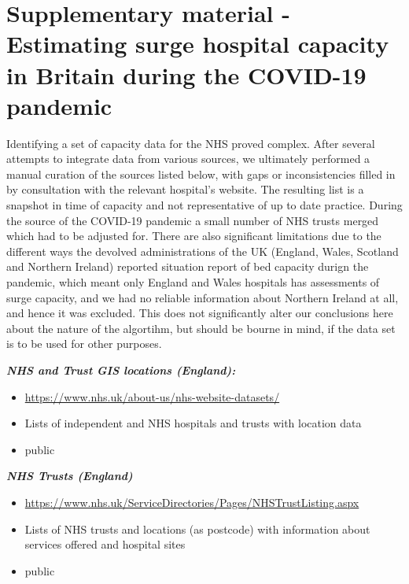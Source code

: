 \documentclass[
]{article}
\providecommand{\tightlist}{%
  \setlength{\itemsep}{0pt}\setlength{\parskip}{0pt}}
\begin{document}
\hypertarget{supplementary-material---estimating-surge-hospital-capacity-in-britain-during-the-covid-19-pandemic}{%
\section{Supplementary material - Estimating surge hospital capacity in
Britain during the COVID-19
pandemic}\label{supplementary-material---estimating-surge-hospital-capacity-in-britain-during-the-covid-19-pandemic}}

Identifying a set of capacity data for the NHS proved complex. After
several attempts to integrate data from various sources, we ultimately
performed a manual curation of the sources listed below, with gaps or
inconsistencies filled in by consultation with the relevant hospital's
website. The resulting list is a snapshot in time of capacity and not
representative of up to date practice. During the source of the COVID-19
pandemic a small number of NHS trusts merged which had to be adjusted
for. There are also significant limitations due to the different ways
the devolved administrations of the UK (England, Wales, Scotland and
Northern Ireland) reported situation report of bed capacity durign the
pandemic, which meant only England and Wales hospitals has assessments
of surge capacity, and we had no reliable information about Northern
Ireland at all, and hence it was excluded. This does not significantly
alter our conclusions here about the nature of the algortihm, but should
be bourne in mind, if the data set is to be used for other purposes.

\textbf{\emph{NHS and Trust GIS locations (England):}}

\begin{itemize}
\tightlist
\item
  \url{https://www.nhs.uk/about-us/nhs-website-datasets/}
\item
  Lists of independent and NHS hospitals and trusts with location data
\item
  public
\end{itemize}

\textbf{\emph{NHS Trusts (England)}}

\begin{itemize}
\tightlist
\item
  \url{https://www.nhs.uk/ServiceDirectories/Pages/NHSTrustListing.aspx}
\item
  Lists of NHS trusts and locations (as postcode) with information about
  services offered and hospital sites
\item
  public
\end{itemize}
\end{document}
